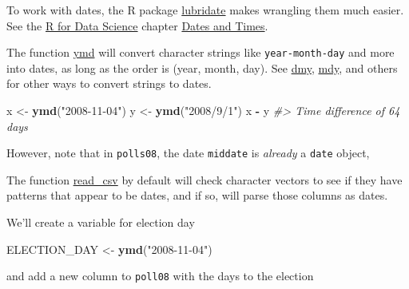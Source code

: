 \documentclass[]{book}
\newenvironment{Shaded}{\begin{snugshade}}{\end{snugshade}}
\newcommand{\CommentTok}[1]{\textcolor[rgb]{0.56,0.35,0.01}{\textit{#1}}}
\newcommand{\KeywordTok}[1]{\textcolor[rgb]{0.13,0.29,0.53}{\textbf{#1}}}
\newcommand{\NormalTok}[1]{#1}
\newcommand{\OperatorTok}[1]{\textcolor[rgb]{0.81,0.36,0.00}{\textbf{#1}}}
\newcommand{\StringTok}[1]{\textcolor[rgb]{0.31,0.60,0.02}{#1}}
\theoremstyle{definition}
\theoremstyle{definition}
\theoremstyle{definition}
\theoremstyle{remark}
\begin{document}
To work with dates, the R package
\href{https://cran.r-project.org/package=lubridate}{lubridate} makes
wrangling them much easier. See the \href{http://r4ds.had.co.nz/}{R for
Data Science} chapter
\href{http://r4ds.had.co.nz/dates-and-times.html}{Dates and Times}.

The function
\href{https://www.rdocumentation.org/packages/lubridate/topics/ymd}{ymd}
will convert character strings like \texttt{year-month-day} and more
into dates, as long as the order is (year, month, day). See
\href{https://www.rdocumentation.org/packages/lubridate/topics/dmy}{dmy},
\href{https://www.rdocumentation.org/packages/lubridate/topics/mdy}{mdy},
and others for other ways to convert strings to dates.

\begin{Shaded}
\begin{Highlighting}[]
\NormalTok{x <-}\StringTok{ }\KeywordTok{ymd}\NormalTok{(}\StringTok{"2008-11-04"}\NormalTok{)}
\NormalTok{y <-}\StringTok{ }\KeywordTok{ymd}\NormalTok{(}\StringTok{"2008/9/1"}\NormalTok{)}
\NormalTok{x }\OperatorTok{-}\StringTok{ }\NormalTok{y}
\CommentTok{#> Time difference of 64 days}
\end{Highlighting}
\end{Shaded}

However, note that in \texttt{polls08}, the date \texttt{middate} is
\emph{already} a \texttt{date} object,

\begin{Shaded}
\end{Shaded}

The function
\href{https://www.rdocumentation.org/packages/readr/topics/read_csv}{read\_csv}
by default will check character vectors to see if they have patterns
that appear to be dates, and if so, will parse those columns as dates.

We'll create a variable for election day

\begin{Shaded}
\begin{Highlighting}[]
\NormalTok{ELECTION_DAY <-}\StringTok{ }\KeywordTok{ymd}\NormalTok{(}\StringTok{"2008-11-04"}\NormalTok{)}
\end{Highlighting}
\end{Shaded}

and add a new column to \texttt{poll08} with the days to the election
\end{document}
